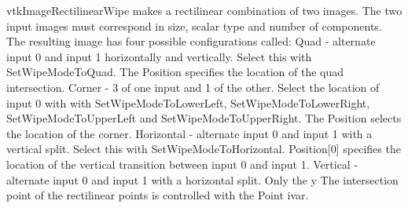 vtk\-Image\-Rectilinear\-Wipe makes a rectilinear combination of two images. The two input images must correspond in size, scalar type and number of components. The resulting image has four possible configurations called\-: Quad -\/ alternate input 0 and input 1 horizontally and vertically. Select this with Set\-Wipe\-Mode\-To\-Quad. The Position specifies the location of the quad intersection. Corner -\/ 3 of one input and 1 of the other. Select the location of input 0 with with Set\-Wipe\-Mode\-To\-Lower\-Left, Set\-Wipe\-Mode\-To\-Lower\-Right, Set\-Wipe\-Mode\-To\-Upper\-Left and Set\-Wipe\-Mode\-To\-Upper\-Right. The Position selects the location of the corner. Horizontal -\/ alternate input 0 and input 1 with a vertical split. Select this with Set\-Wipe\-Mode\-To\-Horizontal. Position\mbox{[}0\mbox{]} specifies the location of the vertical transition between input 0 and input 1. Vertical -\/ alternate input 0 and input 1 with a horizontal split. Only the y The intersection point of the rectilinear points is controlled with the Point ivar.

